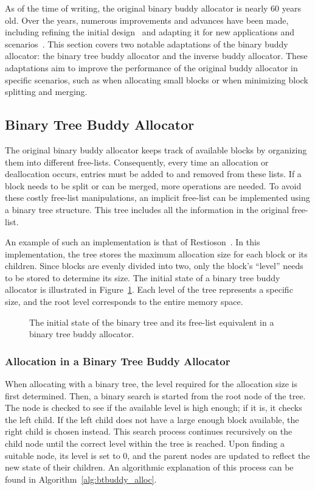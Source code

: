 As of the time of writing, the original binary buddy allocator is nearly 60 years old. Over the years, numerous improvements and advances have been made, including refining the initial design~\cite{genbuddy} and adapting it for new applications and scenarios~\cite{nbbs, park2014ibuddy}. This section covers two notable adaptations of the binary buddy allocator: the binary tree buddy allocator and the inverse buddy allocator. These adaptations aim to improve the performance of the original buddy allocator in specific scenarios, such as when allocating small blocks or when minimizing block splitting and merging.

\subsection{Binary Tree Buddy Allocator}
The original binary buddy allocator keeps track of available blocks by organizing them into different free-lists. Consequently, every time an allocation or deallocation occurs, entries must be added to and removed from these lists. If a block needs to be split or can be merged, more operations are needed. To avoid these costly free-list manipulations, an implicit free-list can be implemented using a binary tree structure. This tree includes all the information in the original free-list.

An example of such an implementation is that of Restioson~\cite{btbuddy}. In this implementation, the tree stores the maximum allocation size for each block or its children. Since blocks are evenly divided into two, only the block's ``level'' needs to be stored to determine its size. The initial state of a binary tree buddy allocator is illustrated in Figure~\ref{fig:btbuddyinitial}. Each level of the tree represents a specific size, and the root level corresponds to the entire memory space.

\begin{figure}[h]
  \centering
  
  \caption{The initial state of the binary tree and its free-list equivalent in a binary tree buddy allocator.}
  \label{fig:btbuddyinitial}
\end{figure}

\subsubsection{Allocation in a Binary Tree Buddy Allocator}
When allocating with a binary tree, the level required for the allocation size is first determined. Then, a binary search is started from the root node of the tree. The node is checked to see if the available level is high enough; if it is, it checks the left child. If the left child does not have a large enough block available, the right child is chosen instead. This search process continues recursively on the child node until the correct level within the tree is reached. Upon finding a suitable node, its level is set to 0, and the parent nodes are updated to reflect the new state of their children. An algorithmic explanation of this process can be found in Algorithm~\ref{alg:btbuddy_alloc}.

